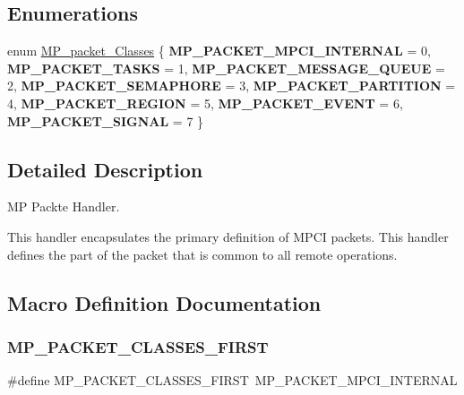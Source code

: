 \subsection*{Enumerations}
\begin{DoxyCompactItemize}
\item 
enum \mbox{\hyperlink{group__RTEMSScoreMPPacket_gafed9717210f8917e5acb8e63f2c6bac3}{M\+P\+\_\+packet\+\_\+\+Classes}} \{ \newline
{\bfseries M\+P\+\_\+\+P\+A\+C\+K\+E\+T\+\_\+\+M\+P\+C\+I\+\_\+\+I\+N\+T\+E\+R\+N\+AL} = 0, 
{\bfseries M\+P\+\_\+\+P\+A\+C\+K\+E\+T\+\_\+\+T\+A\+S\+KS} = 1, 
{\bfseries M\+P\+\_\+\+P\+A\+C\+K\+E\+T\+\_\+\+M\+E\+S\+S\+A\+G\+E\+\_\+\+Q\+U\+E\+UE} = 2, 
{\bfseries M\+P\+\_\+\+P\+A\+C\+K\+E\+T\+\_\+\+S\+E\+M\+A\+P\+H\+O\+RE} = 3, 
\newline
{\bfseries M\+P\+\_\+\+P\+A\+C\+K\+E\+T\+\_\+\+P\+A\+R\+T\+I\+T\+I\+ON} = 4, 
{\bfseries M\+P\+\_\+\+P\+A\+C\+K\+E\+T\+\_\+\+R\+E\+G\+I\+ON} = 5, 
{\bfseries M\+P\+\_\+\+P\+A\+C\+K\+E\+T\+\_\+\+E\+V\+E\+NT} = 6, 
{\bfseries M\+P\+\_\+\+P\+A\+C\+K\+E\+T\+\_\+\+S\+I\+G\+N\+AL} = 7
 \}
\end{DoxyCompactItemize}


\subsection{Detailed Description}
MP Packte Handler. 

This handler encapsulates the primary definition of M\+P\+CI packets. This handler defines the part of the packet that is common to all remote operations. 

\subsection{Macro Definition Documentation}
\mbox{\label{group__RTEMSScoreMPPacket_gae880d4bef40315cdfdad23a2e1d0c1be}} 
\subsubsection{\texorpdfstring{MP\_PACKET\_CLASSES\_FIRST}{MP\_PACKET\_CLASSES\_FIRST}}
{\footnotesize\ttfamily \#define M\+P\+\_\+\+P\+A\+C\+K\+E\+T\+\_\+\+C\+L\+A\+S\+S\+E\+S\+\_\+\+F\+I\+R\+ST~M\+P\+\_\+\+P\+A\+C\+K\+E\+T\+\_\+\+M\+P\+C\+I\+\_\+\+I\+N\+T\+E\+R\+N\+AL}

